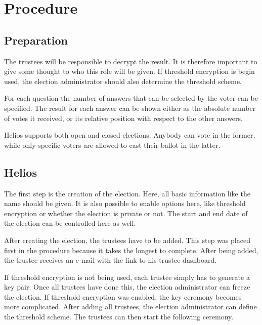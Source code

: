 % 
%

\section{Procedure}
\label{sec:procedure}

\subsection{Preparation}

The trustees will be responsible to decrypt the result. It is therefore important to give some thought to who this role will be given. If threshold encryption is begin used, the election administrator should also determine the threshold scheme.

\par For each question the number of answers that can be selected by the voter can be specified. The result for each answer can be shown either as the absolute number of votes it received, or its relative position with respect to the other answers.

\par Helios supports both open and closed elections. Anybody can vote in the former, while only specific voters are allowed to cast their ballot in the latter.

\subsection{Helios}

The first step is the creation of the election. Here, all basic information like the name should be given. It is also possible to enable options here, like threshold encryption or whether the election is private or not. The start and end date of the election can be controlled here as well.

\par After creating the election, the trustees have to be added. This step was placed first in the procedure because it takes the longest to complete. After being added, the trustee receives an e-mail with the link to his trustee dashboard.

\par If threshold encryption is not being used, each trustee simply has to generate a key pair. Once all trustees have done this, the election administrator can freeze the election. If threshold encryption was enabled, the key ceremony becomes more complicated. After adding all trustees, the election administrator can define the threshold scheme. The trustees can then start the following ceremony.

